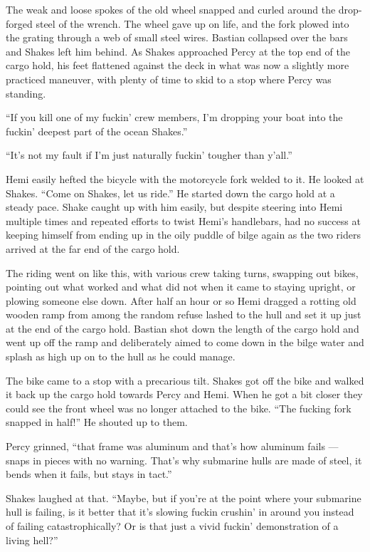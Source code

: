 \documentclass[
]{scrbook}
\begin{document}
The weak and loose spokes of the old wheel snapped and curled around the
drop-forged steel of the wrench. The wheel gave up on life, and the fork
plowed into the grating through a web of small steel wires. Bastian
collapsed over the bars and Shakes left him behind. As Shakes approached
Percy at the top end of the cargo hold, his feet flattened against the
deck in what was now a slightly more practiced maneuver, with plenty of
time to skid to a stop where Percy was standing.

``If you kill one of my fuckin' crew members, I'm dropping your boat
into the fuckin' deepest part of the ocean Shakes.''

``It's not my fault if I'm just naturally fuckin' tougher than y'all.''

Hemi easily hefted the bicycle with the motorcycle fork welded to it. He
looked at Shakes. ``Come on Shakes, let us ride.'' He started down the
cargo hold at a steady pace. Shake caught up with him easily, but
despite steering into Hemi multiple times and repeated efforts to twist
Hemi's handlebars, had no success at keeping himself from ending up in
the oily puddle of bilge again as the two riders arrived at the far end
of the cargo hold.

The riding went on like this, with various crew taking turns, swapping
out bikes, pointing out what worked and what did not when it came to
staying upright, or plowing someone else down. After half an hour or so
Hemi dragged a rotting old wooden ramp from among the random refuse
lashed to the hull and set it up just at the end of the cargo hold.
Bastian shot down the length of the cargo hold and went up off the ramp
and deliberately aimed to come down in the bilge water and splash as
high up on to the hull as he could manage.

The bike came to a stop with a precarious tilt. Shakes got off the bike
and walked it back up the cargo hold towards Percy and Hemi. When he got
a bit closer they could see the front wheel was no longer attached to
the bike. ``The fucking fork snapped in half!'' He shouted up to them.

Percy grinned, ``that frame was aluminum and that's how aluminum fails
--- snaps in pieces with no warning. That's why submarine hulls are made
of steel, it bends when it fails, but stays in tact.''

Shakes laughed at that. ``Maybe, but if you're at the point where your
submarine hull is failing, is it better that it's slowing fuckin
crushin' in around you instead of failing catastrophically? Or is that
just a vivid fuckin' demonstration of a living hell?''
\end{document}
